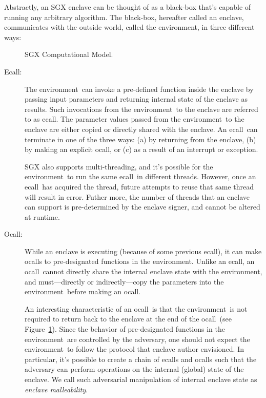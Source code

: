 \documentclass[10pt, letterpaper]{article}
\newcommand{\ecall}{\textsf{ecall}}
\newcommand{\ocall}{\textsf{ocall}}
\newcommand{\env}{\textsf{environment}}
\begin{document}
  Abstractly, an SGX enclave can be thought of as a black-box that's
  capable of running any arbitrary algorithm. The black-box, hereafter
  called an enclave, communicates with the outside world, called the
  \env, in three different ways:

  \begin{figure}[h]
  \centering
  
  \caption{SGX Computational Model.}
  \label{fig:model}
  \end{figure}

  \begin{description}
  \item[Ecall:] The \env\ can invoke a pre-defined function inside the
    enclave by passing input parameters and returning internal state
    of the enclave as results. Such invocations from the \env\ to the
    enclave are referred to as \ecall. The parameter values passed
    from the \env\ to the enclave are either copied or directly shared
    with the enclave. An \ecall\ can terminate in one of the three
    ways: (a) by returning from the enclave, (b) by making an explicit
    \ocall, or (c) as a result of an interrupt or exception.

    SGX also supports multi-threading, and it's possible for the
    \env\ to run the same \ecall\ in different threads. However, once
    an \ecall\ has acquired the thread, future attempts to reuse that
    same thread will result in error. Futher more, the number of
    threads that an enclave can support is pre-determined by the
    enclave signer, and cannot be altered at runtime.

  \item [Ocall:] While an enclave is executing (because of some
    previous \ecall), it can make \ocall s to pre-designated functions
    in the \env.  Unlike an \ecall, an \ocall\ cannot directly share
    the internal enclave state with the \env, and must---directly or
    indirectly---copy the parameters into the \env\ before making an
    \ocall.

    An interesting characteristic of an \ocall\ is that the \env\ is
    not required to return back to the enclave at the end of the
    \ocall\ (see Figure~\ref{fig:model}). Since the behavior of
    pre-designated functions in the \env\ are controlled by the
    adversary, one should not expect the \env\ to follow the protocol
    that enclave author envisioned. In particular, it's possible to
    create a chain of \ecall s and \ocall s such that the adversary
    can perform operations on the internal (global) state of the
    enclave. We call such adversarial manipulation of internal enclave
    state as \textit{enclave malleability}.


\end{description}
\end{document}

